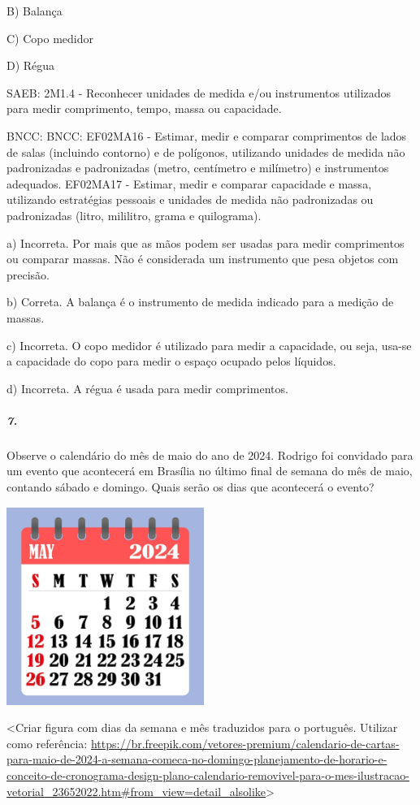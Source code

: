 B) Balança

C) Copo medidor

D) Régua

SAEB: 2M1.4 - Reconhecer unidades de medida e/ou instrumentos utilizados
para medir comprimento, tempo, massa ou capacidade.

BNCC: BNCC: EF02MA16 - Estimar, medir e comparar comprimentos de lados
de salas (incluindo contorno) e de polígonos, utilizando unidades de
medida não padronizadas e padronizadas (metro, centímetro e milímetro) e
instrumentos adequados. EF02MA17 - Estimar, medir e comparar capacidade
e massa, utilizando estratégias pessoais e unidades de medida não
padronizadas ou padronizadas (litro, mililitro, grama e quilograma).

a) Incorreta. Por mais que as mãos podem ser usadas para medir
comprimentos ou comparar massas. Não é considerada um instrumento que
pesa objetos com precisão.

b) Correta. A balança é o instrumento de medida indicado para a medição
de massas.

c) Incorreta. O copo medidor é utilizado para medir a capacidade, ou
seja, usa-se a capacidade do copo para medir o espaço ocupado pelos
líquidos.

d) Incorreta. A régua é usada para medir comprimentos.

\subparagraph{7. }\label{section-151}

Observe o calendário do mês de maio do ano de 2024. Rodrigo foi
convidado para um evento que acontecerá em Brasília no último final de
semana do mês de maio, contando sábado e domingo. Quais serão os dias
que acontecerá o evento?

\includegraphics[width=2.53108in,height=2.54167in]{media/image167.png}

\textless{}Criar figura com dias da semana e mês traduzidos para o
português. Utilizar como referência:
\url{https://br.freepik.com/vetores-premium/calendario-de-cartas-para-maio-de-2024-a-semana-comeca-no-domingo-planejamento-de-horario-e-conceito-de-cronograma-design-plano-calendario-removivel-para-o-mes-ilustracao-vetorial_23652022.htm\#from_view=detail_alsolike}\textgreater{}

